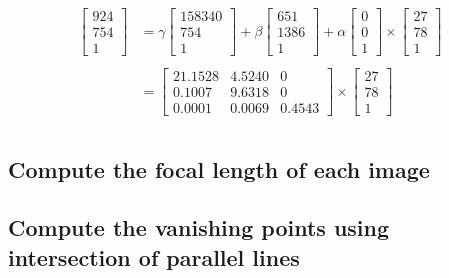 \documentclass[12pt, oneside]{article}
\begin{document}
\begin{align*}
    \begin{bmatrix} 924   \\ 754   \\ 1   \end{bmatrix}  &= 
    \gamma  \begin{bmatrix} 158340  \\ 754 \\ 1  \end{bmatrix} + 
    \beta \begin{bmatrix} 651   \\ 1386   \\   1   \end{bmatrix} + 
    \alpha \begin{bmatrix} 0   \\ 0   \\   1   \end{bmatrix} \times 
    \begin{bmatrix} 27 \\ 78 \\ 1  \end{bmatrix} \\ \\
      &= \begin{bmatrix}
      21.1528     &   4.5240  & 0 \\
      0.1007       &   9.6318   & 0 \\
      0.0001       &   0.0069 & 0.4543
      \end{bmatrix} \times 
      \begin{bmatrix} 27 \\ 78 \\ 1  \end{bmatrix} \\
  \end{align*} 

\subsection{Compute the focal length of each image}
\subsection{Compute the vanishing points using intersection of parallel lines}
\end{document}
